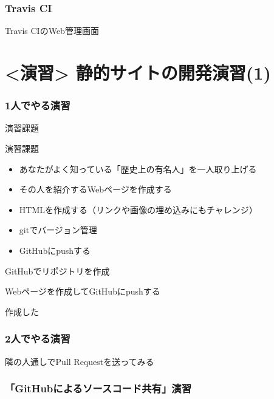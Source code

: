 \documentclass[t, aspectratio=169]{beamer}
\begin{document}
\section{Travis CI}
\label{sec-5-2}
\begin{frame}[label=sec-5-2-1]{Travis CIのWeb管理画面}
\end{frame}
\part{<演習> 静的サイトの開発演習(1)}
\label{sec-6}
\section{1人でやる演習}
\label{sec-6-1}
\begin{frame}[label=sec-6-1-1]{演習課題}
\begin{block}{演習課題}
\begin{itemize}
\item あなたがよく知っている「歴史上の有名人」を一人取り上げる
\item その人を紹介するWebページを作成する
\item HTMLを作成する（リンクや画像の埋め込みにもチャレンジ）
\item gitでバージョン管理
\item GitHubにpushする
\end{itemize}
\end{block}
\end{frame}
\begin{frame}[label=sec-6-1-2]{}
\end{frame}
\begin{frame}[label=sec-6-1-3]{GitHubでリポジトリを作成}
\end{frame}
\begin{frame}[label=sec-6-1-4]{Webページを作成してGitHubにpushする}
\end{frame}
\begin{frame}[label=sec-6-1-5]{作成した}
\end{frame}
\section{2人でやる演習}
\label{sec-6-2}
\begin{frame}[label=sec-6-2-1]{隣の人通しでPull Requestを送ってみる}
\end{frame}
\section{「GitHubによるソースコード共有」演習}
\label{sec-6-3}
\begin{frame}[label=sec-6-3-1]{}
\end{frame}
\end{document}
